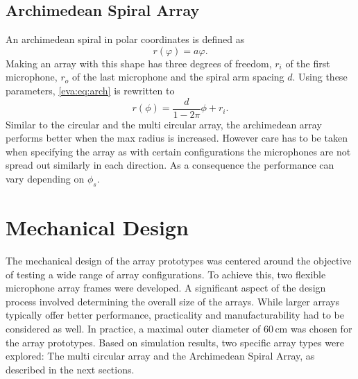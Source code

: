 \newpage
\subsection{Archimedean Spiral Array}
An archimedean spiral in polar coordinates is defined as
\begin{equation}
	\label{eva:eq:arch}
	r(\varphi) = a \varphi.
\end{equation}
Making an array with this shape has three degrees of freedom,
$r_i$ of the first microphone, $r_o$ of the last microphone and the
spiral arm spacing $d$.
Using these parameters, \eqref{eva:eq:arch} is rewritten to
\begin{equation}
	r(\phi) = \frac{d}{1 - 2\pi} \phi + r_i.
\end{equation}
Similar to the circular and the multi circular array,
the archimedean array performs better when the max 
radius is increased.
However care has to be taken when specifying the array
as with certain configurations the microphones are not 
spread out similarly in each direction.
As a consequence the performance can vary depending 
on $\phi_s$.



\newpage
\section{Mechanical Design}
The mechanical design of the array prototypes was centered around the objective of testing a wide range of array configurations.
To achieve this, two flexible microphone array frames were developed.
A significant aspect of the design process involved determining the overall size of the arrays.
While larger arrays typically offer better performance, practicality and manufacturability had to be considered as well.
In practice, a maximal outer diameter of 60\,cm was chosen for the array prototypes.
Based on simulation results, two specific array types were explored: The multi circular array and the Archimedean Spiral Array, as described in the next sections.

